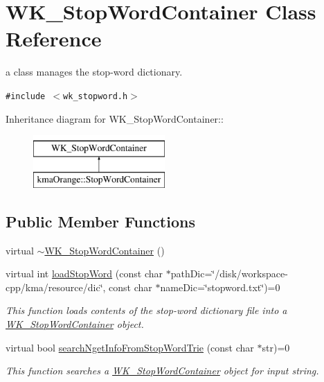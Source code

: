 \hypertarget{classWK__StopWordContainer}{
\section{WK\_\-StopWordContainer Class Reference}
\label{classWK__StopWordContainer}
}
a class manages the stop-word dictionary.  


{\tt \#include $<$wk\_\-stopword.h$>$}

Inheritance diagram for WK\_\-StopWordContainer::\begin{figure}[H]
\begin{center}
\leavevmode
\includegraphics[height=2cm]{classWK__StopWordContainer}
\end{center}
\end{figure}
\subsection*{Public Member Functions}
\begin{CompactItemize}
\item 
virtual \hyperlink{classWK__StopWordContainer_bbda87b2202288b98b9d3639595b9c88}{$\sim$WK\_\-StopWordContainer} ()
\item 
virtual int \hyperlink{classWK__StopWordContainer_2c85df71a7a6a3b86495aed3d21e26d7}{loadStopWord} (const char $\ast$pathDic=\char`\"{}/disk/workspace-cpp/kma/resource/dic\char`\"{}, const char $\ast$nameDic=\char`\"{}stopword.txt\char`\"{})=0
\begin{CompactList}\small\item\em This function loads contents of the stop-word dictionary file into a \hyperlink{classWK__StopWordContainer}{WK\_\-StopWordContainer} object. \item\end{CompactList}\item 
virtual bool \hyperlink{classWK__StopWordContainer_03819e17b2d47d76452505b9cf03c685}{searchNgetInfoFromStopWordTrie} (const char $\ast$str)=0
\begin{CompactList}\small\item\em This function searches a \hyperlink{classWK__StopWordContainer}{WK\_\-StopWordContainer} object for input string. \item\end{CompactList}\end{CompactItemize}
